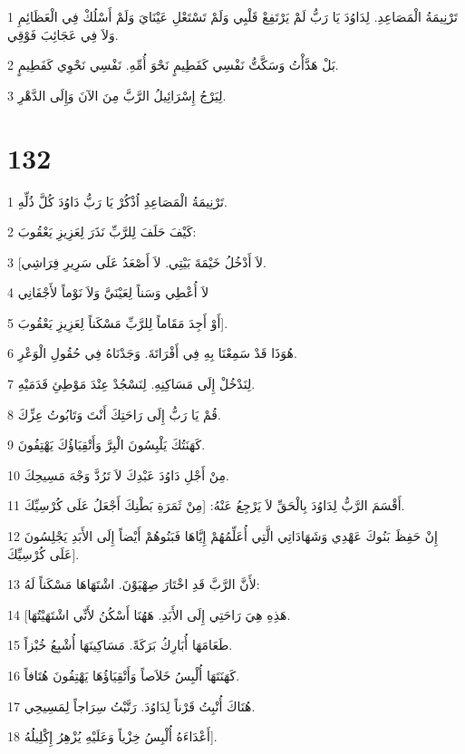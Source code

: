 \par 1 تَرْنِيمَةُ الْمَصَاعِدِ. لِدَاوُدَ يَا رَبُّ لَمْ يَرْتَفِعْ قَلْبِي وَلَمْ تَسْتَعْلِ عَيْنَايَ وَلَمْ أَسْلُكْ فِي الْعَظَائِمِ وَلاَ فِي عَجَائِبَ فَوْقِي.
\par 2 بَلْ هَدَّأْتُ وَسَكَّتُّ نَفْسِي كَفَطِيمٍ نَحْوَ أُمِّهِ. نَفْسِي نَحْوِي كَفَطِيمٍ.
\par 3 لِيَرْجُ إِسْرَائِيلُ الرَّبَّ مِنَ الآنَ وَإِلَى الدَّهْرِ.

\chapter{132}

\par 1 تَرْنِيمَةُ الْمَصَاعِدِ اُذْكُرْ يَا رَبُّ دَاوُدَ كُلَّ ذُلِّهِ.
\par 2 كَيْفَ حَلَفَ لِلرَّبِّ نَذَرَ لِعَزِيزِ يَعْقُوبَ:
\par 3 [لاَ أَدْخُلُ خَيْمَةَ بَيْتِي. لاَ أَصْعَدُ عَلَى سَرِيرِ فِرَاشِي.
\par 4 لاَ أُعْطِي وَسَناً لِعَيْنَيَّ وَلاَ نَوْماً لأَجْفَانِي
\par 5 أَوْ أَجِدَ مَقَاماً لِلرَّبِّ مَسْكَناً لِعَزِيزِ يَعْقُوبَ].
\par 6 هُوَذَا قَدْ سَمِعْنَا بِهِ فِي أَفْرَاتَةَ. وَجَدْنَاهُ فِي حُقُولِ الْوَعْرِ.
\par 7 لِنَدْخُلْ إِلَى مَسَاكِنِهِ. لِنَسْجُدْ عِنْدَ مَوْطِئِ قَدَمَيْهِ.
\par 8 قُمْ يَا رَبُّ إِلَى رَاحَتِكَ أَنْتَ وَتَابُوتُ عِزِّكَ.
\par 9 كَهَنَتُكَ يَلْبِسُونَ الْبِرَّ وَأَتْقِيَاؤُكَ يَهْتِفُونَ.
\par 10 مِنْ أَجْلِ دَاوُدَ عَبْدِكَ لاَ تَرُدَّ وَجْهَ مَسِيحِكَ.
\par 11 أَقْسَمَ الرَّبُّ لِدَاوُدَ بِالْحَقِّ لاَ يَرْجِعُ عَنْهُ: [مِنْ ثَمَرَةِ بَطْنِكَ أَجْعَلُ عَلَى كُرْسِيِّكَ.
\par 12 إِنْ حَفِظَ بَنُوكَ عَهْدِي وَشَهَادَاتِي الَّتِي أُعَلِّمُهُمْ إِيَّاهَا فَبَنُوهُمْ أَيْضاً إِلَى الأَبَدِ يَجْلِسُونَ عَلَى كُرْسِيِّكَ].
\par 13 لأَنَّ الرَّبَّ قَدِ اخْتَارَ صِهْيَوْنَ. اشْتَهَاهَا مَسْكَناً لَهُ:
\par 14 [هَذِهِ هِيَ رَاحَتِي إِلَى الأَبَدِ. هَهُنَا أَسْكُنُ لأَنِّي اشْتَهَيْتُهَا.
\par 15 طَعَامَهَا أُبَارِكُ بَرَكَةً. مَسَاكِينَهَا أُشْبِعُ خُبْزاً.
\par 16 كَهَنَتَهَا أُلْبِسُ خَلاَصاً وَأَتْقِيَاؤُهَا يَهْتِفُونَ هُتَافاً.
\par 17 هُنَاكَ أُنْبِتُ قَرْناً لِدَاوُدَ. رَتَّبْتُ سِرَاجاً لِمَسِيحِي.
\par 18 أَعْدَاءَهُ أُلْبِسُ خِزْياً وَعَلَيْهِ يُزْهِرُ إِكْلِيلُهُ].

